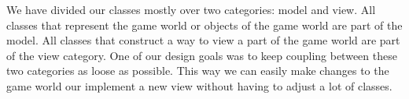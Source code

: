 We have divided our classes mostly over two categories: model and view. All classes that represent the game world or objects of the game world are part of the model. All classes that construct a way to view a part of the game world are part of the view category. One of our design goals was to keep coupling between these two categories as loose as possible. This way we can easily make changes to the game world our implement a new view without having to adjust a lot of classes.
